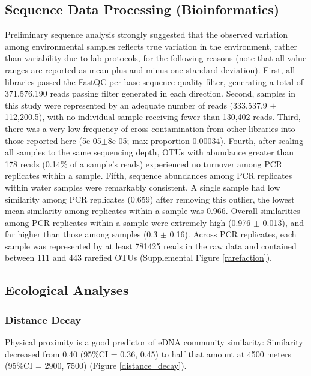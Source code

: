 \documentclass[11pt,letterpaper]{article} %
\begin{document}
\subsection*{Sequence Data Processing (Bioinformatics)}
Preliminary sequence analysis strongly suggested that the observed variation among environmental samples reflects true variation in the environment, rather than variability due to lab protocols, for the following reasons (note that all value ranges are reported as mean plus and minus one standard deviation). First, all libraries passed the FastQC per-base sequence quality filter, generating a total of 371,576,190 reads passing filter generated in each direction. Second, samples in this study were represented by an adequate number of reads (333,537.9 $\pm$ 112,200.5), with no individual sample receiving fewer than 130,402 reads. Third, there was a very low frequency of cross-contamination from other libraries into those reported here (5e-05$\pm$8e-05; max proportion 0.00034). Fourth, after scaling all samples to the same sequencing depth, OTUs with abundance greater than 178 reads (0.14\% of a sample's reads) experienced no turnover among PCR replicates within a sample. Fifth, sequence abundances among PCR replicates within water samples were remarkably consistent. A single sample had low similarity among PCR replicates (0.659) after removing this outlier, the lowest mean similarity among replicates within a sample was 0.966. Overall similarities among PCR replicates within a sample were extremely high (0.976 $\pm$ 0.013), and far higher than those among samples (0.3 $\pm$ 0.16).
Across PCR replicates, each sample was represented by at least 781425 reads in the raw data and contained between 111 and 443 rarefied OTUs (Supplemental Figure \ref{rarefaction}).


\subsection*{Ecological Analyses}
\subsubsection*{Distance Decay}
Physical proximity is a good predictor of eDNA community similarity: Similarity decreased from 0.40 (95\%CI = 0.36, 0.45) to half that amount at 4500 meters (95\%CI = 2900, 7500) (Figure \ref{distance_decay}).
\end{document}
